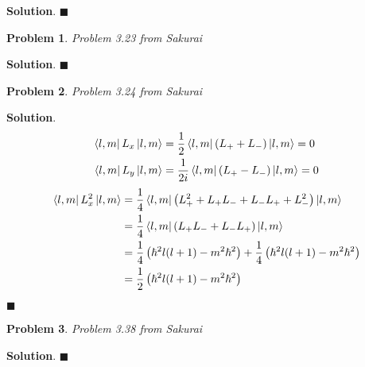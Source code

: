 \documentclass[12pt]{article}
\newtheorem{p}{Problem}
\theoremstyle{definition}
\newenvironment{s}{%
        \begin{trivlist} \item \textbf{Solution}. }{%
            \hspace*{\fill} $\blacksquare$\end{trivlist}}%
\begin{document}
{\begin{s}
\end{s}

\begin{p}
Problem 3.23 from Sakurai
\end{p}

\begin{s}
\end{s}

\begin{p}
Problem 3.24 from Sakurai
\end{p}

\begin{s}
\begin{align*}
\bra{l,m}L_{x}\ket{l,m} &= \frac{1}{2}\bra{l,m}\left(L_{+}+L_{-}\right)\ket{l,m} = 0\\
\bra{l,m}L_{y}\ket{l,m} &= \frac{1}{2i}\bra{l,m}\left(L_{+}-L_{-}\right)\ket{l,m} = 0
\end{align*}
\begin{align*}
\bra{l,m}L_{x}^{2}\ket{l,m} &= \frac{1}{4}\bra{l,m}\left(L_{+}^{2}+L_{+}L_{-}+L_{-}L_{+}+L_{-}^{2}\right)\ket{l,m}\\
&= \frac{1}{4}\bra{l,m}\left(L_{+}L_{-}+L_{-}L_{+}\right)\ket{l,m}\\
&= \frac{1}{4}\left(\hbar^{2}l(l+1)-m^{2}\hbar^{2}\right) + \frac{1}{4}\left(\hbar^{2}l(l+1)-m^{2}\hbar^{2}\right) \\
&= \frac{1}{2}\left(\hbar^{2}l(l+1)-m^{2}\hbar^{2}\right)\\
\end{align*}


\end{s}
\begin{p}
Problem 3.38 from Sakurai
\end{p}

\begin{s}
\end{s}
\end{document}
